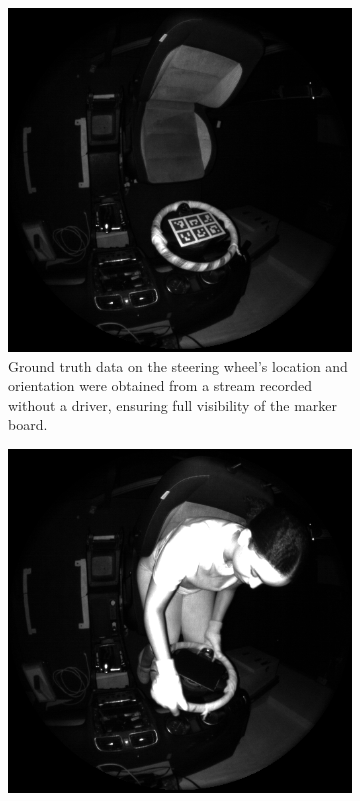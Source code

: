 \begin{figure}[ht]
    \centering
    \begin{subfigure}[t]{0.45\textwidth}
        \centering
        \includegraphics[width=\textwidth]{media/chapter 3/gt_stream.png}
        \caption{Ground truth data on the steering wheel’s 
        location and orientation were obtained from a stream 
        recorded without a driver, ensuring full visibility 
        of the marker board.}
        \label{fig:gt_stream}
    \end{subfigure}\hfill
    \begin{subfigure}[t]{0.45\textwidth}
        \centering
        \includegraphics[width=\textwidth]{media/chapter 3/main_stream.png}

\end{subfigure}
\end{figure}
